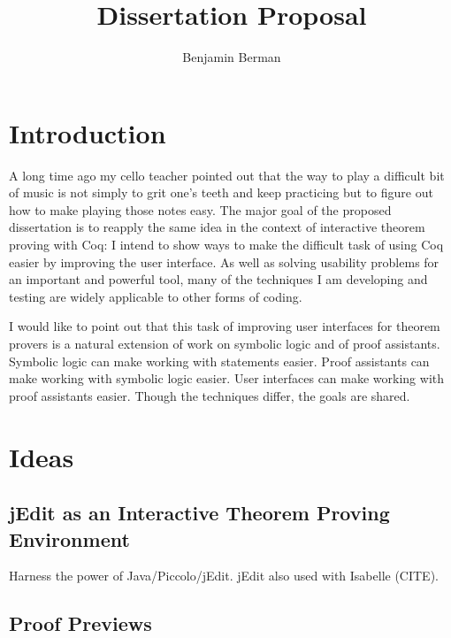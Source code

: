 \documentclass[11pt]{amsart}
\title{Dissertation Proposal}
\author{Benjamin Berman}
\begin{document}
\maketitle
\section{Introduction}

A long time ago my cello teacher pointed out that the way to play a difficult bit of music is not simply to grit one's teeth and keep practicing but to figure out how to make playing those notes easy.  The major goal of the proposed dissertation is to reapply the same idea in the context of interactive theorem proving with Coq:  I intend to show ways to make the difficult task of using Coq easier by improving the user interface.  As well as solving usability problems for an important and powerful tool, many of the techniques I am developing and testing are widely applicable to other forms of coding.

I would like to point out that this task of improving user interfaces for theorem provers is a natural extension of work on symbolic logic and of proof assistants.  Symbolic logic can make working with statements easier.  Proof assistants can make working with symbolic logic easier.  User interfaces can make working with proof assistants easier.  Though the techniques differ, the goals are shared.

\section{Ideas}

\subsection{jEdit as an Interactive Theorem Proving Environment}

Harness the power of Java/Piccolo/jEdit.  jEdit also used with Isabelle (CITE).

\subsection{Proof Previews}
\end{document}

